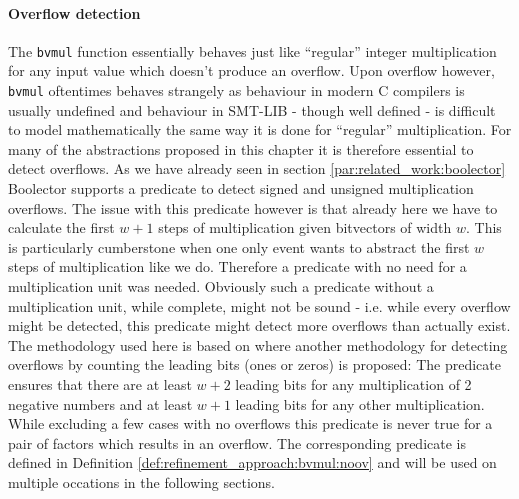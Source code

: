 \paragraph{Overflow detection}
The \texttt{bvmul} function essentially behaves just like \enquote{regular} integer multiplication for any input value
which doesn't produce an overflow.
Upon overflow however, \texttt{bvmul} oftentimes behaves strangely as behaviour in modern C compilers is usually undefined
and behaviour in SMT-LIB - though well defined - is difficult to model mathematically the same way it is done for \enquote{regular} multiplication.
For many of the abstractions proposed in this chapter it is therefore essential to detect overflows.
As we have already seen in section \ref{par:related_work:boolector} Boolector supports a predicate to detect signed and unsigned multiplication overflows.
The issue with this predicate however is that already here we have to calculate the first $w+1$ steps of multiplication given bitvectors of width $w$.
This is particularly cumberstone when one only event wants to abstract the first $w$ steps of multiplication like we do.
Therefore a predicate with no need for a multiplication unit was needed.
Obviously such a predicate without a multiplication unit, while complete, might not be sound - i.e. while every overflow might be detected,
this predicate might detect more overflows than actually exist.
The methodology used here is based on \cite{Warren-HackersDelight} where another methodology for detecting overflows by counting the leading bits (ones or zeros)
is proposed:
The predicate ensures that there are at least $w+2$ leading bits for any multiplication of 2 negative numbers and at least $w+1$ leading bits for any other multiplication.
While excluding a few cases with no overflows this predicate is never true for a pair of factors which results in an overflow.
The corresponding predicate is defined in Definition \ref{def:refinement_approach:bvmul:noov} and will be used on multiple occations in the following sections.

